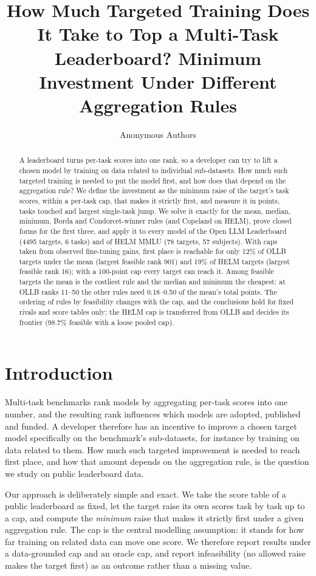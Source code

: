 \documentclass{article}
\title{How Much Targeted Training Does It Take to Top a Multi-Task Leaderboard? Minimum Investment Under Different Aggregation Rules}
\author{Anonymous Authors}
\begin{document}
\maketitle

\begin{abstract}
A leaderboard turns per-task scores into one rank, so a developer can try to lift a chosen model by training on data related to individual sub-datasets. How much such targeted training is needed to put the model first, and how does that depend on the aggregation rule? We define the investment as the minimum raise of the target's task scores, within a per-task cap, that makes it strictly first, and measure it in points, tasks touched and largest single-task jump. We solve it exactly for the mean, median, minimum, Borda and Condorcet-winner rules (and Copeland on HELM), prove closed forms for the first three, and apply it to every model of the Open LLM Leaderboard (4495 targets, 6 tasks) and of HELM MMLU (78 targets, 57 subjects). With caps taken from observed fine-tuning gains, first place is reachable for only 12\% of OLLB targets under the mean (largest feasible rank 901) and 19\% of HELM targets (largest feasible rank 16); with a 100-point cap every target can reach it. Among feasible targets the mean is the costliest rule and the median and minimum the cheapest: at OLLB ranks 11--50 the other rules need 0.18--0.50 of the mean's total points. The ordering of rules by feasibility changes with the cap, and the conclusions hold for fixed rivals and score tables only; the HELM cap is transferred from OLLB and decides its frontier (98.7\% feasible with a loose pooled cap).
\end{abstract}

\section{Introduction}
\label{sec:intro}
Multi-task benchmarks rank models by aggregating per-task scores into one number, and the resulting rank influences which models are adopted, published and funded. A developer therefore has an incentive to improve a chosen target model specifically on the benchmark's sub-datasets, for instance by training on data related to them. How much such targeted improvement is needed to reach first place, and how that amount depends on the aggregation rule, is the question we study on public leaderboard data.

Our approach is deliberately simple and exact. We take the score table of a public leaderboard as fixed, let the target raise its own scores task by task up to a cap, and compute the \emph{minimum} raise that makes it strictly first under a given aggregation rule. The cap is the central modelling assumption: it stands for how far training on related data can move one score. We therefore report results under a data-grounded cap and an oracle cap, and report infeasibility (no allowed raise makes the target first) as an outcome rather than a missing value.
\end{document}
